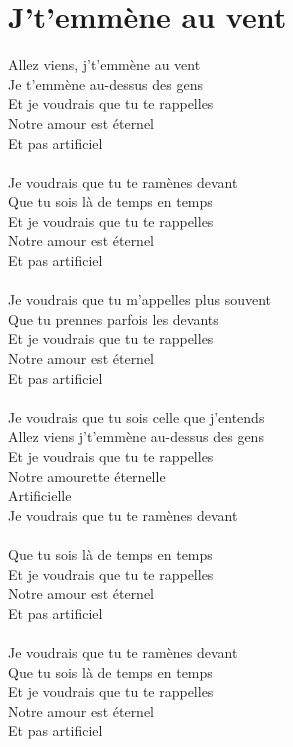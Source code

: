 \section*{J't'emmène au vent}
Allez viens, j't'emmène au vent\\
Je t'emmène au-dessus des gens\\
Et je voudrais que tu te rappelles\\
Notre amour est éternel\\
Et pas artificiel\\\\
Je voudrais que tu te ramènes devant\\
Que tu sois là de temps en temps\\
Et je voudrais que tu te rappelles\\
Notre amour est éternel\\
Et pas artificiel\\\\
Je voudrais que tu m'appelles plus souvent\\
Que tu prennes parfois les devants\\
Et je voudrais que tu te rappelles\\
Notre amour est éternel\\
Et pas artificiel\\\\
Je voudrais que tu sois celle que j'entends\\
Allez viens j't'emmène au-dessus des gens\\
Et je voudrais que tu te rappelles\\
Notre amourette éternelle\\
Artificielle\\
Je voudrais que tu te ramènes devant\\\\
Que tu sois là de temps en temps\\
Et je voudrais que tu te rappelles\\
Notre amour est éternel\\
Et pas artificiel\\\\
Je voudrais que tu te ramènes devant\\
Que tu sois là de temps en temps\\
Et je voudrais que tu te rappelles\\
Notre amour est éternel\\
Et pas artificiel\\\\
